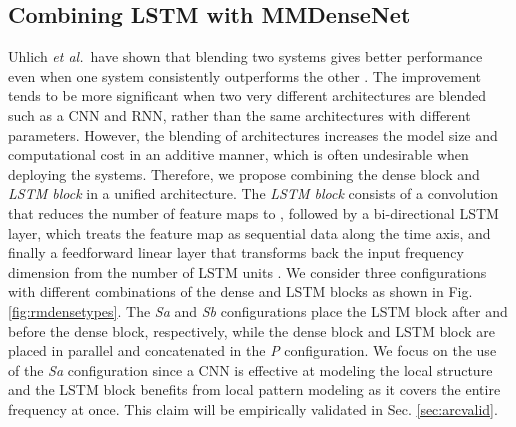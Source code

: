 \documentclass{article}
\newcommand{\etal}{\textit{et al.}}
\begin{document}
\subsection{Combining LSTM with MMDenseNet}
Uhlich \etal~have shown that blending two systems gives better performance even when one system consistently outperforms the other \cite{Uhlich17}. The improvement tends to be more significant when two very different architectures are blended such as a CNN and RNN, rather than the same architectures with different parameters. However, the blending of architectures increases the  model size and computational cost in an additive manner, which is often undesirable when deploying the systems. Therefore, we propose combining the dense block and {\it LSTM block} in a unified architecture. The {\it LSTM block} consists of a  convolution that reduces the number of feature maps to , followed by a bi-directional LSTM layer, which treats the feature map as sequential data along the time axis, and finally a feedforward linear layer that transforms back the input frequency dimension  from the number of LSTM units . We consider three configurations with different combinations of the dense and LSTM blocks as shown in Fig. \ref{fig:rmdensetypes}. The {\it Sa} and {\it Sb} configurations place the LSTM block after and before the dense block, respectively, while the dense block and LSTM block are placed in parallel and concatenated in the {\it P} configuration. We focus on the use of the {\it Sa} configuration since a CNN is effective at modeling the local structure and the LSTM block benefits from local pattern modeling as it covers the entire frequency at once. This claim will be empirically validated in Sec. \ref{sec:arcvalid}.
\end{document}
